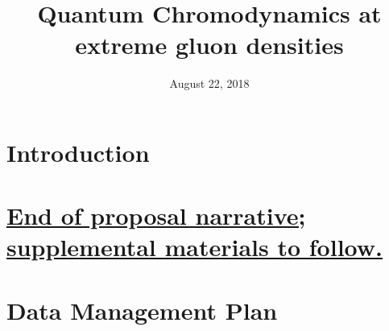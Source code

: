 \documentclass{DOEproposal}
\institute{North Carolina State University}
\title{Quantum Chromodynamics at extreme gluon densities}
\date{August 22, 2018}
\renewcommand*{\maketitle}{}
\begin{document}
    \maketitle

    \renewcommand{\contentsname}{Table of Contents}
    \tableofcontents
    \newpage

    \setcounter{page}{1}
    \section{Introduction}
    
    \newpage



    
    
    
    





    
		\vspace{1em}
    \section*{\underline{End of proposal narrative; supplemental materials to follow.}}
    \newpage


    
	    \section{Data Management Plan}
        \label{sec:data_management}
        
	\newpage 
\end{document}

